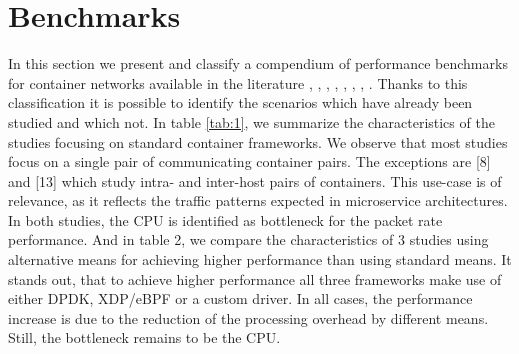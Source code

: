 \documentclass[conference]{IEEEtran}
\begin{document}
\section{Benchmarks}
In this section we present and classify a compendium of performance benchmarks for container networks available in the literature 
\cite{IEEE_INFOCOM_2018:K. Suo}, \cite{HotConNet_17:Zhao}, \cite{Nakamura:2018}, \cite{Boeira:2021}, \cite{Bankston:2018}, \cite{CoNEXT:2018}, \cite{ICTC_2018:Park}, \cite{NOMS_2016:Claassen}. Thanks to this classification it is possible to identify the scenarios which have already been studied and which not. In table \ref{tab:1}, we summarize the characteristics of the studies focusing on standard container frameworks. We observe that most studies focus on a single pair of communicating container pairs. The exceptions are [8] and [13] which study intra- and inter-host pairs of containers. This use-case is of relevance, as it reflects the traffic patterns expected in microservice architectures. In both studies, the CPU is identified as bottleneck for the packet rate performance. And in table 2, we compare the characteristics of 3 studies using alternative means for achieving higher performance than using standard means. It stands out, that to achieve higher performance all three frameworks make use of either DPDK, XDP/eBPF or a custom driver. In all cases, the performance increase is due to the reduction of the processing overhead by different means. Still, the bottleneck remains to be the CPU.
\end{document}
